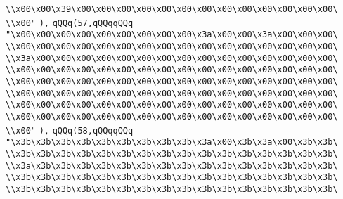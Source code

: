 \verb|\\x00\x00\x39\x00\x00\x00\x00\x00\x00\x00\x00\x00\x00\x00\x00\x00\|\newline
\verb|\\x00"|\newline
\verb|),|\newline
\verb|qQQq(57,qQQqqQQq|\newline
\verb|"\x00\x00\x00\x00\x00\x00\x00\x00\x00\x3a\x00\x00\x3a\x00\x00\x00\|\newline
\verb|\\x00\x00\x00\x00\x00\x00\x00\x00\x00\x00\x00\x00\x00\x00\x00\x00\|\newline
\verb|\\x3a\x00\x00\x00\x00\x00\x00\x00\x00\x00\x00\x00\x00\x00\x00\x00\|\newline
\verb|\\x00\x00\x00\x00\x00\x00\x00\x00\x00\x00\x00\x00\x00\x00\x00\x00\|\newline
\verb|\\x00\x00\x00\x00\x00\x00\x00\x00\x00\x00\x00\x00\x00\x00\x00\x00\|\newline
\verb|\\x00\x00\x00\x00\x00\x00\x00\x00\x00\x00\x00\x00\x00\x00\x00\x00\|\newline
\verb|\\x00\x00\x00\x00\x00\x00\x00\x00\x00\x00\x00\x00\x00\x00\x00\x00\|\newline
\verb|\\x00\x00\x00\x00\x00\x00\x00\x00\x00\x00\x00\x00\x00\x00\x00\x00\|\newline
\verb|\\x00"|\newline
\verb|),|\newline
\verb|qQQq(58,qQQqqQQq|\newline
\verb|"\x3b\x3b\x3b\x3b\x3b\x3b\x3b\x3b\x3b\x3a\x00\x3b\x3a\x00\x3b\x3b\|\newline
\verb|\\x3b\x3b\x3b\x3b\x3b\x3b\x3b\x3b\x3b\x3b\x3b\x3b\x3b\x3b\x3b\x3b\|\newline
\verb|\\x3a\x3b\x3b\x3b\x3b\x3b\x3b\x3b\x3b\x3b\x3b\x3b\x3b\x3b\x3b\x3b\|\newline
\verb|\\x3b\x3b\x3b\x3b\x3b\x3b\x3b\x3b\x3b\x3b\x3b\x3b\x3b\x3b\x3b\x3b\|\newline
\verb|\\x3b\x3b\x3b\x3b\x3b\x3b\x3b\x3b\x3b\x3b\x3b\x3b\x3b\x3b\x3b\x3b\|\newline
